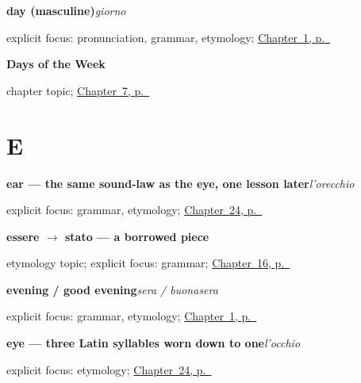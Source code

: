\noindent\begin{minipage}[t]{\linewidth}
\raggedright
\textbf{day (masculine)}\enspace\emph{giorno}\par
\footnotesize explicit focus: pronunciation, grammar, etymology; \hyperref[ch:greetings]{Chapter~1, p.~\pageref*{ch:greetings}}
\end{minipage}\par\smallskip

\noindent\begin{minipage}[t]{\linewidth}
\raggedright
\textbf{Days of the Week}\par
\footnotesize chapter topic; \hyperref[ch:it-days-of-the-week]{Chapter~7, p.~\pageref*{ch:it-days-of-the-week}}
\end{minipage}\par\smallskip

\section*{E}

\noindent\begin{minipage}[t]{\linewidth}
\raggedright
\textbf{ear — the same sound-law as the eye, one lesson later}\enspace\emph{l'orecchio}\par
\footnotesize explicit focus: grammar, etymology; \hyperref[ch:it-heart-eyes-ears-mouth]{Chapter~24, p.~\pageref*{ch:it-heart-eyes-ears-mouth}}
\end{minipage}\par\smallskip

\noindent\begin{minipage}[t]{\linewidth}
\raggedright
\textbf{essere $\to$ stato — a borrowed piece}\par
\footnotesize etymology topic; explicit focus: grammar; \hyperref[ch:it-essere-andare-past]{Chapter~16, p.~\pageref*{ch:it-essere-andare-past}}
\end{minipage}\par\smallskip

\noindent\begin{minipage}[t]{\linewidth}
\raggedright
\textbf{evening / good evening}\enspace\emph{sera / buonasera}\par
\footnotesize explicit focus: grammar, etymology; \hyperref[ch:greetings]{Chapter~1, p.~\pageref*{ch:greetings}}
\end{minipage}\par\smallskip

\noindent\begin{minipage}[t]{\linewidth}
\raggedright
\textbf{eye — three Latin syllables worn down to one}\enspace\emph{l'occhio}\par
\footnotesize explicit focus: etymology; \hyperref[ch:it-heart-eyes-ears-mouth]{Chapter~24, p.~\pageref*{ch:it-heart-eyes-ears-mouth}}
\end{minipage}\par\smallskip

